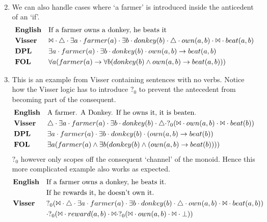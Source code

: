 \documentclass[12pt]{article}
\begin{document}
\begin{enumerate}
\begin{align*}
\end{align*}
\item
We can also handle cases where `a farmer' is introduced inside the anticedent of an `if'.
\begin{align*}
&\text{\textbf{English}}&&\text{If a farmer owns a donkey, he beats it} \\
&\text{\textbf{Visser}}&&\Bowtie \cdot \triangle \cdot \exists a \cdot farmer(a) \cdot \exists b \cdot donkey(b) \cdot \triangle \cdot own(a,b) \cdot \Bowtie \cdot beat(a,b) \\
&\text{\textbf{DPL}}&&\exists a \cdot farmer(a) \cdot \exists b \cdot donkey(b) \cdot own(a,b) \rightarrow beat(a,b) \\
&\text{\textbf{FOL}}&&\forall a(farmer(a) \rightarrow \forall b(donkey(b) \wedge own(a,b) \rightarrow beat(a,b))) \\
\end{align*}
\item
This is an example from Visser \cite{visser1999donkey} containing sentences with no verbs. Notice how the Visser logic has to introduce $?_0$ to prevent the antecedent from becoming part of the consequent.
\begin{align*}
&\text{\textbf{English}}&&\text{A farmer. A Donkey. If he owns it, it is beaten.} \\
&\text{\textbf{Visser}}&&\triangle \cdot \exists a \cdot farmer(a) \cdot \exists b \cdot donkey(b) \cdot \triangle \cdot ?_0(\Bowtie \cdot own(a,b) \cdot \Bowtie \cdot beat(b)) \\
&\text{\textbf{DPL}}&&\exists a \cdot farmer(a) \cdot \exists b \cdot donkey(b) \cdot (own(a,b) \rightarrow beat(b)) \\
&\text{\textbf{FOL}}&&\exists a(farmer(a) \wedge \exists b(donkey(b) \wedge (own(a,b) \rightarrow beat(b)))) \\
\end{align*}
$?_0$ however only scopes off the consequent `channel' of the monoid. Hence this more complicated example also works as expected.
\begin{align*}
&\text{\textbf{English}}&&\text{If a farmer owns a donkey, he beats it.}\\
&&&\text{If he rewards it, he doesn't own it.} \\
&\text{\textbf{Visser}}&&?_0(\Bowtie \cdot \triangle \cdot \exists a \cdot farmer(a) \cdot \exists b \cdot donkey(b) \cdot \triangle \cdot own(a,b) \cdot \Bowtie \cdot beat(a,b))\\&&& \cdot ?_0(\Bowtie \cdot reward(a,b) \cdot \Bowtie \cdot ?_0(\Bowtie \cdot own(a,b) \cdot \Bowtie \cdot \bot)) \\

\end{align*}
\end{enumerate}
\end{document}
